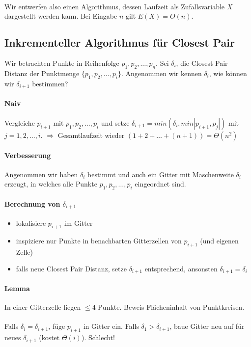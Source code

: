\paragraph*{} Wir entwerfen also einen Algorithmus, dessen Laufzeit als Zufallsvariable $X$ dargestellt werden kann. Bei Eingabe $n$ gilt $E(X) = O(n)$.


\subsection{Inkrementeller Algorithmus für Closest Pair}
Wir betrachten Punkte in Reihenfolge $p_1,p_2,\dots,p_n$. Sei $\delta_i$, die Closest Pair Distanz der Punktmenge $\{ p_1,p_2,\dots,p_i \}$. Angenommen wir kennen $\delta_i$, wie können wir $\delta_{i+1}$ bestimmen?

\paragraph*{Naiv} Vergleiche $p_{i+1}$ mit $p_1,p_2,\dots,p_i$ und setze $\delta_{i+1} = min(\delta_i, min|p_{i+1},p_j|)$ mit $j = 1,2,\dots,i$. $\Rightarrow$ Gesamtlaufzeit wieder $(1+2+\dots+(n+1)) = \Theta(n^2)$

\paragraph*{Verbesserung} Angenommen wir haben $\delta_i$ bestimmt und auch ein Gitter mit Maschenweite $\delta_i$ erzeugt, in welches alle Punkte $p_1,p_2,\dots,p_i$ eingeordnet sind.

\paragraph*{Berechnung von $\delta_{i+1}$}
\begin{itemize}
	\item lokalisiere $p_{i+1}$ im Gitter
	\item inspiziere nur Punkte in benachbarten Gitterzellen von $p_{i+1}$ (und eigenen Zelle)
	\item falls neue Closest Pair Distanz, setze $\delta_{i+1}$ entsprechend, ansonsten $\delta_{i+1} = \delta_i$
\end{itemize}

\paragraph*{Lemma} In einer Gitterzelle liegen $\leq 4$ Punkte. Beweis Flächeninhalt von Punktkreisen.

\paragraph*{} Falls $\delta_i = \delta_{i+1}$, füge $p_{i+1}$ in Gitter ein. Falls $\delta_1 > \delta_{i+1}$, baue Gitter neu auf für neues $\delta_{i+1}$ (kostet $\Theta(i)$). Schlecht!
